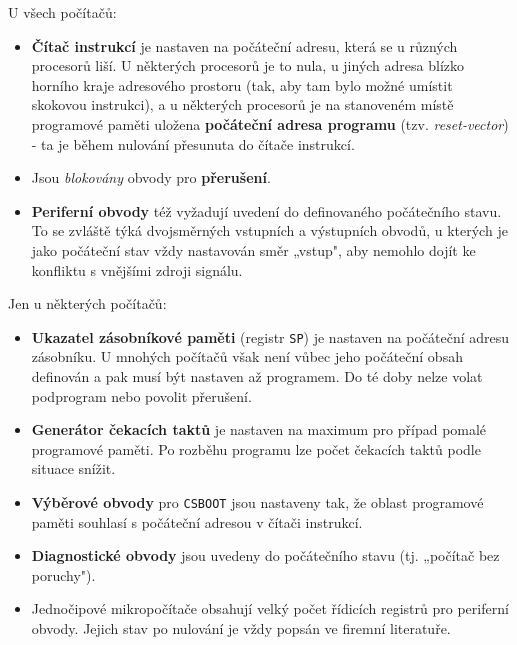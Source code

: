       U všech počítačů:
      \begin{itemize}\addtolength{\itemsep}{-0.5\baselineskip}
        \item \textbf{Čítač instrukcí} je nastaven na počáteční adresu, která se u různých   
              procesorů liší. U některých procesorů je to nula, u jiných adresa blízko horního 
              kraje adresového prostoru (tak, aby tam bylo možné umístit skokovou instrukci), a u 
              některých procesorů je na stanoveném místě programové paměti uložena 
              \textbf{počáteční adresa programu} (tzv. \emph{reset-vector}) - ta je během nulování 
              přesunuta do čítače instrukcí.
        \item Jsou \emph{blokovány} obvody pro \textbf{přerušení}.
        \item \textbf{Periferní obvody} též vyžadují uvedení do definovaného počátečního stavu. To  
              se zvláště týká dvojsměrných vstupních a výstupních obvodů, u kterých je jako 
              počáteční stav vždy nastavován směr „vstup", aby nemohlo dojít ke konfliktu s 
              vnějšími zdroji signálu.
      \end{itemize}  
          
      Jen u některých počítačů:
      \begin{itemize}\addtolength{\itemsep}{-0.5\baselineskip}
        \item \textbf{Ukazatel zásobníkové paměti} (registr \texttt{SP}) je nastaven na počáteční  
              adresu zásobníku. U mnohých počítačů však není vůbec jeho počáteční obsah definován a 
              pak musí být nastaven až programem. Do té doby nelze volat podprogram nebo povolit 
              přerušení.
        \item \textbf{Generátor čekacích taktů} je nastaven na maximum pro případ pomalé    
              programové paměti. Po rozběhu programu lze počet čekacích taktů podle situace snížit.
        \item \textbf{Výběrové obvody} pro \texttt{CSBOOT} jsou nastaveny tak, že oblast 
              programové paměti souhlasí s počáteční adresou v čítači instrukcí.
        \item \textbf{Diagnostické obvody} jsou uvedeny do počátečního stavu (tj. „počítač bez  
              poruchy").
        \item Jednočipové mikropočítače obsahují velký počet řídicích registrů pro periferní     
              obvody. Jejich stav po nulování je vždy popsán ve firemní literatuře.
      \end{itemize}
      
